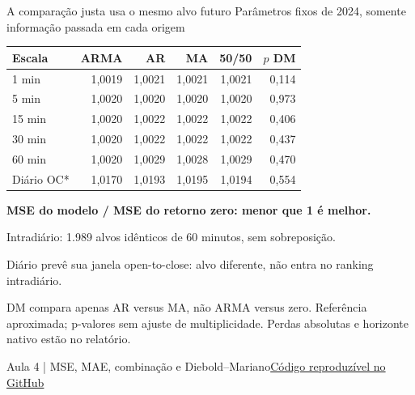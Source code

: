 \documentclass[aspectratio=169,10pt]{beamer}
\newcommand{\source}[2]{\par\vfill{\raggedright\tiny\color{muted}#1\quad\href{#2}{Código reproduzível no GitHub}\par}}
\newcommand{\tagline}[1]{{\small\color{teal}#1}\par\medskip}
\begin{document}
\begin{frame}[t]{A comparação justa usa o mesmo alvo futuro}
\tagline{Parâmetros fixos de 2024, somente informação passada em cada origem}
\centering\small\begin{tabular}{lrrrrr}
\toprule
Escala & ARMA & AR & MA & 50/50 & $p$ DM \\ \midrule
1 min & 1,0019 & 1,0021 & 1,0021 & 1,0021 & 0,114 \\
5 min & 1,0020 & 1,0020 & 1,0020 & 1,0020 & 0,973 \\
15 min & 1,0020 & 1,0022 & 1,0022 & 1,0022 & 0,406 \\
30 min & 1,0020 & 1,0022 & 1,0022 & 1,0022 & 0,437 \\
60 min & 1,0020 & 1,0029 & 1,0028 & 1,0029 & 0,470 \\
Diário OC* & 1,0170 & 1,0193 & 1,0195 & 1,0194 & 0,554 \\
\bottomrule
\end{tabular}\par
\raggedright\medskip\small \textbf{MSE do modelo / MSE do retorno zero: menor que 1 é melhor.}\par Intradiário: 1.989 alvos idênticos de 60 minutos, sem sobreposição.\par\scriptsize *Diário prevê sua janela open-to-close: alvo diferente, não entra no ranking intradiário.\par DM compara apenas AR versus MA, não ARMA versus zero. Referência aproximada; p-valores sem ajuste de multiplicidade. Perdas absolutas e horizonte nativo estão no relatório.
\source{Aula 4 | MSE, MAE, combinação e Diebold--Mariano}{https://github.com/avilarenan/EAD6034/blob/1782cade2ed752ce6b7c1b8b10c316445aef2626/src/ead6034/forecast_evaluation.py}
\end{frame}
\end{document}
